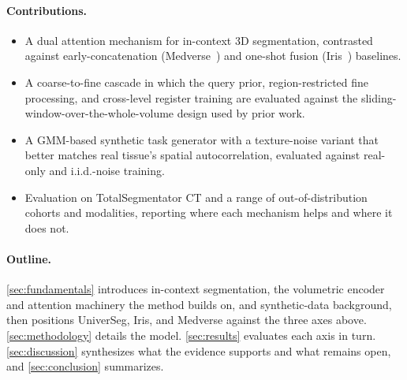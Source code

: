 \paragraph{Contributions.}
\begin{itemize}[leftmargin=1.4em,itemsep=0.1em]
  \item A dual attention mechanism for in-context 3D
    segmentation, contrasted against early-concatenation
    (Medverse~\cite{huMedverseUniversalModel2025a}) and one-shot fusion
    (Iris~\cite{gaoShowSegmentUniversal2025}) baselines.
  \item A coarse-to-fine cascade in which the query prior,
    region-restricted fine processing, and cross-level register training
    are evaluated against the sliding-window-over-the-whole-volume design
    used by prior work.
  \item A GMM-based synthetic task generator with a texture-noise variant
    that better matches real tissue's spatial autocorrelation, evaluated
    against real-only and i.i.d.-noise training.
  \item Evaluation on TotalSegmentator CT and a range of
    out-of-distribution cohorts and modalities, reporting where each
    mechanism helps and where it does not.
\end{itemize}

\paragraph{Outline.} \autoref{sec:fundamentals} introduces in-context
segmentation, the volumetric encoder and attention machinery the method
builds on, and synthetic-data background, then positions UniverSeg, Iris,
and Medverse against the three axes above. \autoref{sec:methodology}
details the model. \autoref{sec:results} evaluates each axis in turn.
\autoref{sec:discussion} synthesizes what the evidence supports and what
remains open, and \autoref{sec:conclusion} summarizes.
